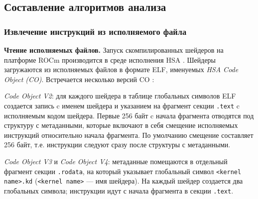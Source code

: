 \documentclass[a4paper,14pt]{extarticle}
\newcommand{\topic}[1]{\textbf{#1.}}
\begin{document}
{\subsection{Составление алгоритмов анализа}

\subsubsection{Извлечение инструкций из исполняемого файла}

\topic{Чтение исполняемых файлов} Запуск скомпилированных шейдеров на платформе ROCm
производится в среде исполнения HSA \cite{hsa}. Шейдеры загружаются из исполняемых файлов
в формате ELF, именуемых \textit{HSA Code Object (CO)}. Встречается несколько версий CO
\cite{llvm-12-amdgpu}:

\begin{ul}
\item  \textit{Code Object V2}: для каждого шейдера в таблице
глобальных символов ELF создается запись c именем шейдера и
указанием на фрагмент секции \verb|.text| c исполняемым кодом шейдера.
Первые 256 байт c начала фрагмента отводятся под структуру с метаданными,
которые включают в себя смещение исполняемых инструкций относительно начала фрагмента.
По умолчанию смещение составляет 256 байт, т.е. инструкции следуют сразу после структуры с метаданными.
\item \textit{Code Object V3} и \textit{Code Object V4}: метаданные помещаются в отдельный
фрагмент секции \verb|.rodata|, на который указывает глобальный символ \verb|<kernel name>.kd|
(\verb|<kernel name>| — имя шейдера). На каждый шейдер создается два
глобальных символа; инструкции идут с начала фрагмента в секции \verb|.text|.
\end{ul}

}
\end{document}
